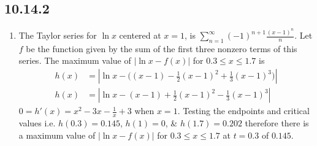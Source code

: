 \documentclass[12pt]{article}
\begin{document}
\subsection*{10.14.2}
\begin{enumerate}
	\item The Taylor series for $\ln x$ centered at $x=1$, is $\sum_{n=1}^{\infty}(-1)^{n+1}\frac{(x-1)^n}{n}$. Let $f$ be the function given by the sum of the first three nonzero terms of this series. The maximum value of $|\ln x-f(x)|$ for $0.3 \leq x \leq 1.7$ is
	      \begin{align*}
	      	h(x) & = \left|\ln x - \Big((x-1)- \frac{1}{2}(x-1)^2 + \frac{1}{3}(x-1)^3\Big)\right| \\
	      	h(x) & = \left|\ln x - (x-1) + \frac{1}{2}(x-1)^2 - \frac{1}{3}(x-1)^3\right|          
	      \end{align*}
	      $0=h'(x) = x^{2}-3x-\frac{1}{x}+3$ when $x=1$. Testing the endpoints and critical values i.e. $h(0.3)=0.145$, $h(1) = 0$, \& $h(1.7) = 0.202$ therefore there is a maximum value of $|\ln x-f(x)|$ for $0.3 \leq x \leq 1.7$ at $t=0.3$ of $\boxed{0.145}$.
	      

\end{enumerate}
\end{document}
